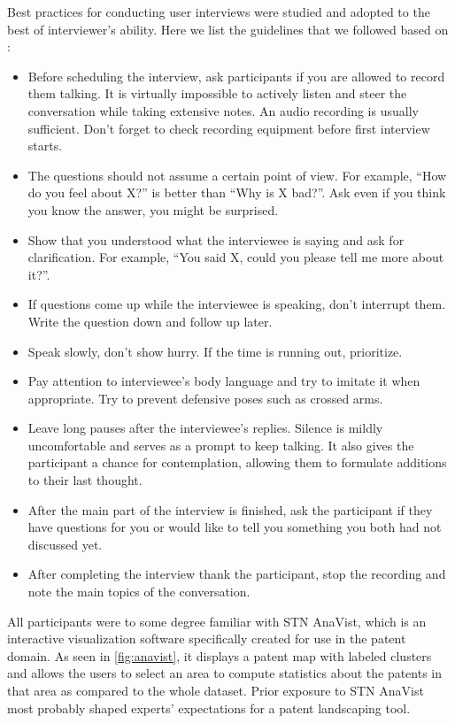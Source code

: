 Best practices for conducting user interviews were studied and adopted to the best of interviewer's ability.
Here we list the guidelines that we followed based on \cite{Portigal2013}:
\begin{itemize}
  \item Before scheduling the interview, ask participants if you are allowed to record them talking.
  It is virtually impossible to actively listen and steer the conversation while taking extensive notes.
  An audio recording is usually sufficient.
  Don't forget to check recording equipment before first interview starts.
  \item The questions should not assume a certain point of view. 
  For example, ``How do you feel about X?'' is better than ``Why is X bad?''.
  Ask even if you think you know the answer, you might be surprised.
  \item Show that you understood what the interviewee is saying and ask for clarification. 
  For example, ``You said X, could you please tell me more about it?''.
  \item If questions come up while the interviewee is speaking, don't interrupt them. 
  Write the question down and follow up later.
  \item Speak slowly, don't show hurry.
  If the time is running out, prioritize.
  \item Pay attention to interviewee's body language and try to imitate it when appropriate. 
  Try to prevent defensive poses such as crossed arms.
  \item Leave long pauses after the interviewee's replies.
  Silence is mildly uncomfortable and serves as a prompt to keep talking.
  It also gives the participant a chance for contemplation, allowing them to formulate additions to their last thought.
  \item After the main part of the interview is finished, ask the participant if they have questions for you or would like to tell you something you both had not discussed yet.
  \item After completing the interview thank the participant, stop the recording and note the main topics of the conversation.
\end{itemize}

All participants were to some degree familiar with STN AnaVist, which is an interactive visualization software specifically created for use in the patent domain.
As seen in \autoref{fig:anavist}, it displays a patent map with labeled clusters and allows the users to select an area to compute statistics about the patents in that area as compared to the whole dataset.
Prior exposure to STN AnaVist most probably shaped experts' expectations for a patent landscaping tool.

